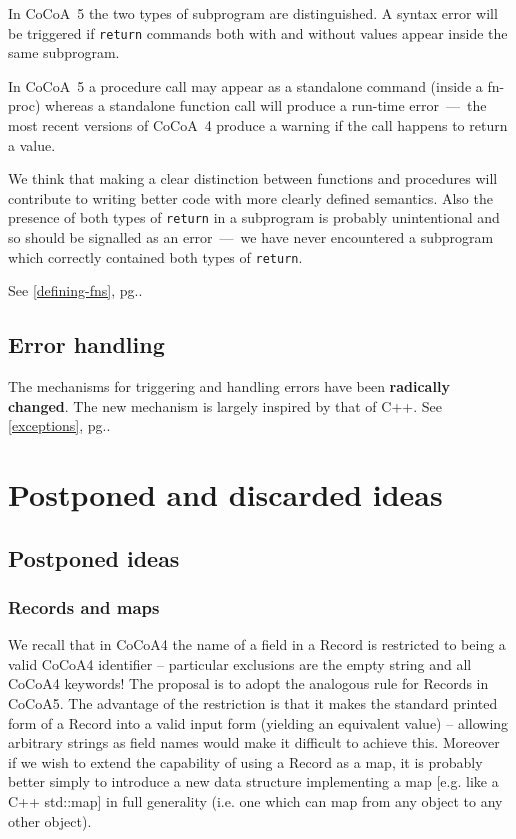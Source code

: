 \documentclass{book}[12,a4paper]
\def\refandpage#1{{\ref{#1}, pg.\pageref{#1}}}
\begin{document}
In CoCoA~5 the two types of subprogram are distinguished.  A syntax error
will be triggered if \texttt{return} commands both with and without values
appear inside the same subprogram.

In CoCoA~5 a procedure call may appear as a standalone command (inside a fn-proc)
whereas a standalone function call will produce a run-time error~---~the most recent
versions of CoCoA~4 produce a warning if the call happens to return a value.

We think that making a clear distinction between functions and procedures
will contribute to writing better code with more clearly defined semantics.
Also the presence of both types of \texttt{return} in a subprogram is
probably unintentional and so should be signalled as an error~---~we have
never encountered a subprogram which correctly contained both types of
\texttt{return}.

See \refandpage{defining-fns}.


\section{Error handling}
\label{diffs:errors}

The mechanisms for triggering and handling errors have been
\textbf{radically changed}.
The new mechanism is largely inspired by that of C++.
See \refandpage{exceptions}.

\chapter{Postponed and discarded ideas}

\section{Postponed ideas}
\label{postponed}

\subsection{Records and maps}

We recall that in CoCoA4 the name of a field in a Record is restricted
to being a valid CoCoA4 identifier -- particular exclusions are the
empty string and all CoCoA4 keywords!  The proposal is to adopt the
analogous rule for Records in CoCoA5.  The advantage of the
restriction is that it makes the standard printed form of a Record
into a valid input form (yielding an equivalent value) -- allowing
arbitrary strings as field names would make it difficult to achieve
this.  Moreover if we wish to extend the capability of using a Record
as a map, it is probably better simply to introduce a new data
structure implementing a map [e.g. like a C++ std::map] in full
generality (i.e. one which can map from any object to any other
object).
\end{document}
